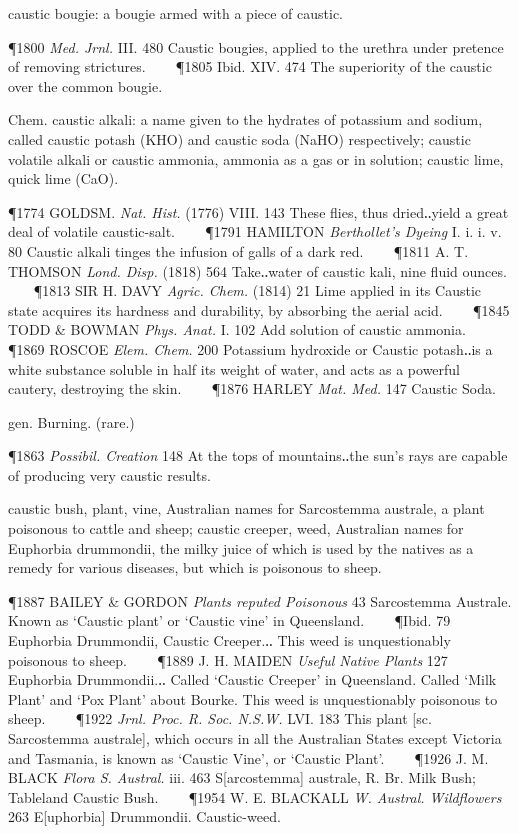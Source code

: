 \begin{description}[wide, labelwidth=!, labelindent=0pt]
\begin{myenumerate}
 caustic bougie: a bougie armed with a piece of caustic.

\P 1800  \textit{Med. Jrnl.} III. 480 Caustic bougies, applied to the urethra under pretence of removing strictures.    
\P 1805  Ibid. XIV. 474 The superiority of the caustic over the common bougie.

 Chem. caustic alkali: a name given to the hydrates of potassium and sodium, called caustic potash (KHO) and caustic soda (NaHO) respectively; caustic volatile alkali or caustic ammonia, ammonia as a gas or in solution; caustic lime, quick lime (CaO).

\P 1774 GOLDSM.  \textit{Nat. Hist.} (1776) VIII. 143 These flies, thus dried‥yield a great deal of volatile caustic-salt.    
\P 1791 HAMILTON  \textit{Berthollet's Dyeing} I. i. i. v. 80 Caustic alkali tinges the infusion of galls of a dark red.    
\P 1811 A. T. THOMSON  \textit{Lond. Disp.} (1818) 564 Take‥water of caustic kali, nine fluid ounces.    
\P 1813 SIR H. DAVY  \textit{Agric. Chem.} (1814) 21 Lime applied in its Caustic state acquires its hardness and durability, by absorbing the aerial acid.    
\P 1845 TODD \& BOWMAN  \textit{Phys. Anat.} I. 102 Add solution of caustic ammonia.    
\P 1869 ROSCOE  \textit{Elem. Chem.} 200 Potassium hydroxide or Caustic potash‥is a white substance soluble in half its weight of water, and acts as a powerful cautery, destroying the skin.    
\P 1876 HARLEY  \textit{Mat. Med.} 147 Caustic Soda.

 gen. Burning. (rare.)

\P 1863 \textit{Possibil.  Creation} 148 At the tops of mountains‥the sun's rays are capable of producing very caustic results.

 caustic bush, plant, vine, Australian names for Sarcostemma australe, a plant poisonous to cattle and sheep; caustic creeper, weed, Australian names for Euphorbia drummondii, the milky juice of which is used by the natives as a remedy for various diseases, but which is poisonous to sheep.

\P 1887 BAILEY \& GORDON  \textit{Plants reputed Poisonous} 43 Sarcostemma Australe. Known as ‘Caustic plant’ or ‘Caustic vine’ in Queensland.    
\P Ibid. 79 Euphorbia Drummondii, Caustic Creeper.‥ This weed is unquestionably poisonous to sheep.    
\P 1889 J. H. MAIDEN  \textit{Useful Native Plants} 127 Euphorbia Drummondii.‥ Called ‘Caustic Creeper’ in Queensland. Called ‘Milk Plant’ and ‘Pox Plant’ about Bourke. This weed is unquestionably poisonous to sheep.    
\P 1922 \textit{Jrnl.  Proc. R. Soc. N.S.W.} LVI. 183 This plant [sc. Sarcostemma australe], which occurs in all the Australian States except Victoria and Tasmania, is known as ‘Caustic Vine’, or ‘Caustic Plant’.    
\P 1926 J. M. BLACK  \textit{Flora S. Austral.} iii. 463 S[arcostemma] australe, R. Br. Milk Bush; Tableland Caustic Bush.    
\P 1954 W. E. BLACKALL  \textit{W. Austral. Wildflowers} 263 E[uphorbia] Drummondii. Caustic-weed.


\end{myenumerate}
\end{description}
